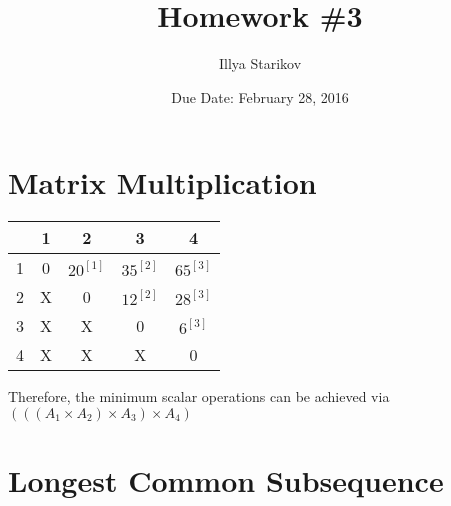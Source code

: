 \documentclass{article}
\title{Homework \#3}
\author{Illya Starikov}
\date{Due Date: February 28, 2016}
\begin{document}
\maketitle

\section{Matrix Multiplication}
\begin{tabular}{ c|c|c|c|c| }
  & 1 & 2 & 3 & 4 \\ \hline
1 & 0 & $20 ^{[1]}$ & $35^{[2]}$ & $65^{[3]}$  \\ \hline
2 & X & 0 & $12 ^{[2]}$ & $28^{[3]}$ \\ \hline
3 & X & X & 0 & $6^{[3]}$ \\ \hline
4 & X & X & X & 0  \\ \hline
\end{tabular}

\noindent
Therefore, the minimum scalar operations can be achieved via $(((A_1 \times A_2) \times A_3) \times A_4)$

\section{Longest Common Subsequence}
\end{document}
